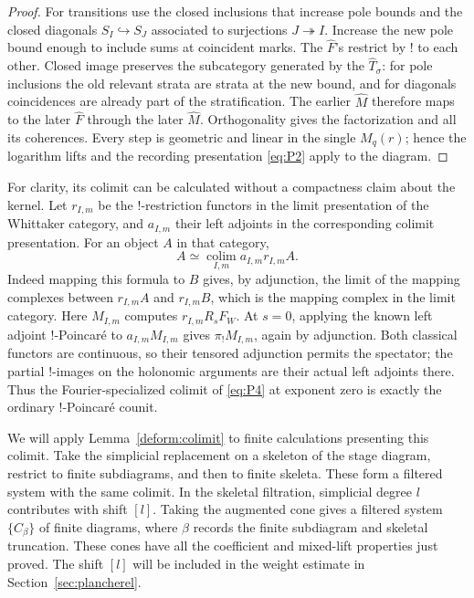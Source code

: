 \begin{proof}
For transitions use the closed inclusions that increase pole
bounds and the closed diagonals $S_I\hookrightarrow S_J$
associated to surjections $J\twoheadrightarrow I$.  Increase
the new pole bound enough to include sums at coincident marks.
The $\widehat F$'s restrict by $!$ to each other.  Closed image
preserves the subcategory generated by the
$\widehat T_\sigma$: for pole inclusions the old relevant strata
are strata at the new bound, and for diagonals coincidences
are already part of the stratification.  The earlier
$\widehat M$ therefore maps to the later $\widehat F$ through
the later $\widehat M$.  Orthogonality gives the factorization
and all its coherences.  Every step is geometric and linear
in the single $M_q(r)$; hence the logarithm lifts and the
recording presentation \eqref{eq:P2} apply to the diagram.
\end{proof}

For clarity, its colimit can be calculated without a compactness
claim about the kernel.  Let $r_{I,m}$ be the $!$-restriction
functors in the limit presentation of the Whittaker category,
and $a_{I,m}$ their left adjoints in the corresponding colimit
presentation.  For an object $A$ in that category,
\[
                A\simeq\operatorname*{colim}_{I,m}
                                  a_{I,m}r_{I,m}A.
\]
Indeed mapping this formula to $B$ gives, by adjunction, the
limit of the mapping complexes between $r_{I,m}A$ and
$r_{I,m}B$, which is the mapping complex in the limit category.
Here $M_{I,m}$ computes $r_{I,m}R_sF_W$.  At $s=0$, applying
the known left adjoint $!$-Poincar\'e to
$a_{I,m}M_{I,m}$ gives $\pi_!M_{I,m}$, again by adjunction.
Both classical functors are continuous, so their tensored
adjunction permits the spectator; the partial $!$-images on
the holonomic arguments are their actual left adjoints there.
Thus the Fourier-specialized colimit of \eqref{eq:P4} at
exponent zero is exactly the ordinary $!$-Poincar\'e counit.

We will apply Lemma~\ref{deform:colimit} to finite calculations
presenting this colimit.  Take the simplicial replacement on a
skeleton of the stage diagram, restrict to finite subdiagrams,
and then to finite skeleta.  These form a filtered system with
the same colimit.  In the skeletal filtration, simplicial
degree $l$ contributes with shift $[l]$.  Taking the augmented
cone gives a filtered system $\{\widehat C_\beta\}$ of finite diagrams,
where $\beta$ records the finite subdiagram and skeletal truncation.
These cones have all the coefficient and mixed-lift properties just
proved.  The shift $[l]$ will be included in the weight estimate in
Section~\ref{sec:plancherel}.

